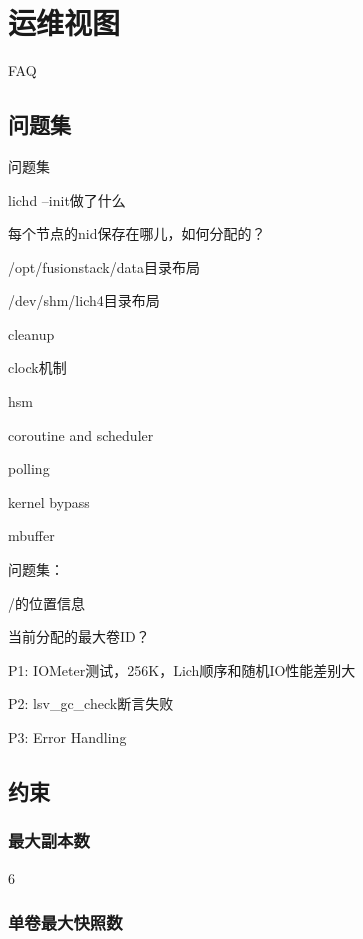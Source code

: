 \chapter{运维视图}

FAQ

\section{问题集}

问题集
\begin{enumbox}
\item lichd --init做了什么
\item 每个节点的nid保存在哪儿，如何分配的？
\item /opt/fusionstack/data目录布局
\item /dev/shm/lich4目录布局
\item cleanup
\item clock机制
\item hsm
\end{enumbox}

\begin{compactitem}
\item coroutine and scheduler
\item polling 
\item kernel bypass
\item mbuffer
\end{compactitem}

问题集：
\begin{enumbox}
\item /的位置信息
\item 当前分配的最大卷ID？
\end{enumbox}

P1: IOMeter测试，256K，Lich顺序和随机IO性能差别大

P2: lsv\_gc\_check断言失败

P3: Error Handling

\section{约束}

\subsection{最大副本数}

6

\subsection{单卷最大快照数}


